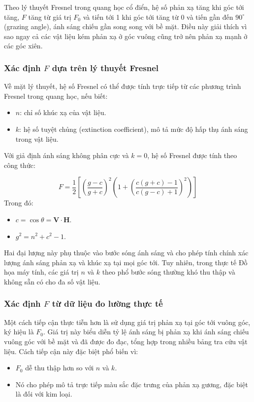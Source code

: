Theo lý thuyết Fresnel trong quang học cổ điển, hệ số phản xạ tăng khi góc tới tăng, $F$ tăng từ giá trị $F_0$ và tiến tới 1 khi góc tới tăng từ $0$ và tiến gần đến $90^\circ$ (grazing angle), ánh sáng chiếu gần song song với bề mặt. Điều này giải thích vì sao ngay cả các vật liệu kém phản xạ ở góc vuông cũng trở nên phản xạ mạnh ở các góc xiên.

\subsubsection{Xác định $F$ dựa trên lý thuyết Fresnel}

Về mặt lý thuyết, hệ số Fresnel có thể được tính trực tiếp từ các phương trình Fresnel trong quang học, nếu biết:
\begin{itemize}
	\item $n$: chỉ số khúc xạ của vật liệu.
	\item $k$: hệ số tuyệt chủng (extinction coefficient), mô tả mức độ hấp thụ ánh sáng trong vật liệu.
\end{itemize}

Với giả định ánh sáng không phân cực và $k = 0$, hệ số Fresnel được tính theo công thức:

\begin{equation}\label{eq:fresnel}
	F = \frac{1}{2}
	\left[
	\left( \frac{g - c}{g + c} \right)^2
	\left(
	1 +
	\left(
	\frac{c(g + c) - 1}{c(g - c) + 1}
	\right)^2
	\right)
	\right]
\end{equation}
Trong đó:
\begin{itemize}
	\item $c = \cos \theta = \mathbf{V} \cdot \mathbf{H}$.
	\item $g^2 = n^2 + c^2 - 1$.
\end{itemize}

Hai đại lượng này phụ thuộc vào bước sóng ánh sáng và cho phép tính chính xác lượng ánh sáng phản xạ và khúc xạ tại mọi góc tới. Tuy nhiên, trong thực tế Đồ họa máy tính, các giá trị $n$ và $k$ theo phổ bước sóng thường khó thu thập và không sẵn có cho đa số vật liệu.

\subsubsection{Xác định $F$ từ dữ liệu đo lường thực tế}

Một cách tiếp cận thực tiễn hơn là sử dụng giá trị phản xạ tại góc tới vuông góc, ký hiệu là $F_0$. Giá trị này biểu diễn tỷ lệ ánh sáng bị phản xạ khi ánh sáng chiếu vuông góc với bề mặt và đã được đo đạc, tổng hợp trong nhiều bảng tra cứu vật liệu. Cách tiếp cận này đặc biệt phổ biến vì:
\begin{itemize}
	\item $F_0$ dễ thu thập hơn so với $n$ và $k$.
	\item Nó cho phép mô tả trực tiếp màu sắc đặc trưng của phản xạ gương, đặc biệt là đối với kim loại.
\end{itemize}

